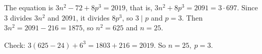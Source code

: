 The equation is $3n^2-72+8p^3=2019$, that is, $3n^2+8p^3=2091=3\cdot697$. Since $3$ divides $3n^2$ and $2091$, it divides $8p^3$, so $3\mid p$ and $p=3$. Then $3n^2=2091-216=1875$, so $n^2=625$ and $n=25$.

Check: $3(625-24)+6^3=1803+216=2019$. So $\boxed{n=25,\ p=3}$.
